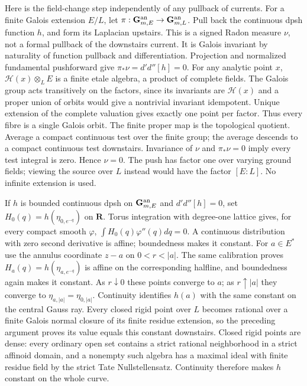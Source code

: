 Here is the field-change step independently of any pullback of currents.
For a finite Galois extension $E/L$, let $\pi:\mathbf G_{m,E}^{\rm an}
\to\mathbf G_{m,L}^{\rm an}$. Pull back the continuous dpsh function $h$,
and form its Laplacian upstairs. This is a signed Radon measure $\nu$,
not a formal pullback of the downstairs current. It is Galois invariant by
naturality of function pullback and differentiation. Projection and normalized
fundamental pushforward give $\pi_*\nu=d'd''[h]=0$.
For any analytic point $x$, $\mathcal H(x)\otimes_LE$ is a finite etale
algebra, a product of complete fields. The Galois group acts transitively
on the factors, since its invariants are $\mathcal H(x)$ and a proper union
of orbits would give a nontrivial invariant idempotent. Unique extension of
the complete valuation gives exactly one point per factor. Thus every fibre
is a single Galois orbit. The finite proper map is the topological quotient.
Average a compact continuous test over the finite group; the average descends
to a compact continuous test downstairs. Invariance of $\nu$ and
$\pi_*\nu=0$ imply every test integral is zero. Hence $\nu=0$.
The push has factor one over varying ground fields; viewing the source over
$L$ instead would have the factor $[E:L]$. No infinite extension is used.

If $h$ is bounded continuous dpsh on $\mathbf G_{m,E}^{\rm an}$ and
$d'd''[h]=0$, set $H_0(q)=h(\eta_{0,e^{-q}})$ on $\mathbf R$.
Torus integration with degree-one lattice gives, for every compact smooth
$\varphi$, $\int H_0(q)\varphi''(q)dq=0$.
A continuous distribution with zero second derivative is affine; boundedness
makes it constant. For $a\in E^*$ use the annulus coordinate $z-a$ on
$0<r<|a|$. The same calibration proves
$H_a(q)=h(\eta_{a,e^{-q}})$ is affine on the corresponding halfline,
and boundedness again makes it constant. As $r\downarrow0$ these points
converge to $a$; as $r\uparrow|a|$ they converge to
$\eta_{a,|a|}=\eta_{0,|a|}$. Continuity identifies $h(a)$ with the same
constant on the central Gauss ray.
Every closed rigid point over $L$ becomes rational over a finite Galois normal
closure of its finite residue extension, so the preceding argument proves
its value equals this constant downstairs. Closed rigid points are dense:
every ordinary open set contains a strict rational neighborhood in a strict
affinoid domain, and a nonempty such algebra has a maximal ideal with finite
residue field by the strict Tate Nullstellensatz. Continuity therefore makes
$h$ constant on the whole curve.

